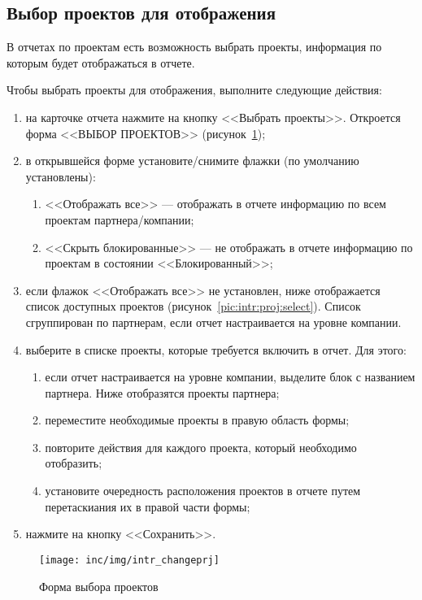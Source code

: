 

\subsection{Выбор проектов для отображения}
\label{subsec:выбор-проектов-для-отображения}

В отчетах по проектам есть возможность выбрать проекты, информация по которым будет отображаться в отчете.

Чтобы выбрать проекты для отображения, выполните следующие действия:
\begin{enumerate}
    \item на карточке отчета нажмите на кнопку <<Выбрать проекты>>. Откроется форма <<ВЫБОР ПРОЕКТОВ>> (рисунок~\ref{pic:changeprj});
    \item в открывшейся форме установите/снимите флажки (по умолчанию установлены):
    \begin{enumerate}
        \item <<Отображать все>> --- отображать в отчете информацию по всем проектам партнера/компании;
        \item <<Скрыть блокированные>> --- не отображать в отчете информацию по проектам в состоянии <<Блокированный>>;
    \end{enumerate}
    \item если флажок <<Отображать все>> не установлен, ниже отображается список доступных проектов (рисунок~\ref{pic:intr:proj:select}). Список сгруппирован по партнерам, если отчет настраивается на уровне компании.
    \item выберите в списке проекты, которые требуется включить в отчет. Для этого:
    \begin{enumerate}
        \item если отчет настраивается на уровне компании, выделите блок с названием партнера. Ниже отобразятся проекты партнера;
        \item переместите необходимые проекты в правую область формы;
        \item повторите действия для каждого проекта, который необходимо отобразить;
        \item установите очередность расположения проектов в отчете путем перетаскиания их в правой части формы;
    \end{enumerate}
    \item нажмите на кнопку <<Сохранить>>.
\end{enumerate}

\begin{figure}[!ht]
    \centering
    \texttt{[image: inc/img/intr\_changeprj]}
    \caption{Форма выбора проектов}
    \label{pic:changeprj}
\end{figure}

